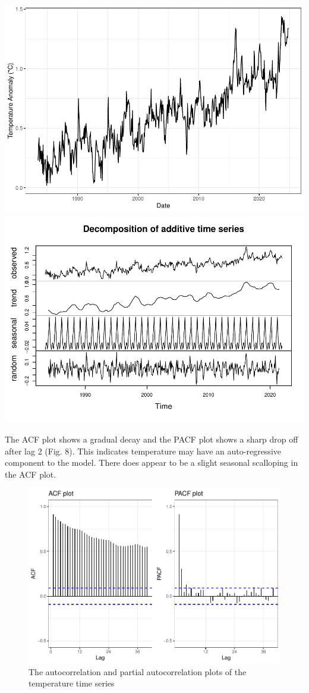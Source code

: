 \documentclass[
]{article}
\begin{document}
\includegraphics{Final_Report_files/figure-latex/unnamed-chunk-12-1.pdf}
\includegraphics{Final_Report_files/figure-latex/unnamed-chunk-13-1.pdf}

The ACF plot shows a gradual decay and the PACF plot shows a sharp drop
off after lag 2 (Fig. 8). This indicates temperature may have an
auto-regressive component to the model. There does appear to be a slight
seasonal scalloping in the ACF plot.

\begin{figure}
\centering
\includegraphics{Final_Report_files/figure-latex/unnamed-chunk-14-1.pdf}
\caption{The autocorrelation and partial autocorrelation plots of the
temperature time series}
\end{figure}
\end{document}
